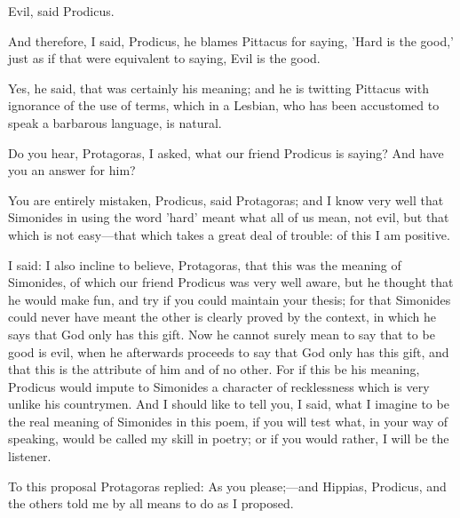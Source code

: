 \documentclass[11pt,letter]{article}
\begin{document}
\par  Evil, said Prodicus.

\par  And therefore, I said, Prodicus, he blames Pittacus for saying, 'Hard is the good,' just as if that were equivalent to saying, Evil is the good.

\par  Yes, he said, that was certainly his meaning; and he is twitting Pittacus with ignorance of the use of terms, which in a Lesbian, who has been accustomed to speak a barbarous language, is natural.

\par  Do you hear, Protagoras, I asked, what our friend Prodicus is saying? And have you an answer for him?

\par  You are entirely mistaken, Prodicus, said Protagoras; and I know very well that Simonides in using the word 'hard' meant what all of us mean, not evil, but that which is not easy—that which takes a great deal of trouble: of this I am positive.

\par  I said: I also incline to believe, Protagoras, that this was the meaning of Simonides, of which our friend Prodicus was very well aware, but he thought that he would make fun, and try if you could maintain your thesis; for that Simonides could never have meant the other is clearly proved by the context, in which he says that God only has this gift. Now he cannot surely mean to say that to be good is evil, when he afterwards proceeds to say that God only has this gift, and that this is the attribute of him and of no other. For if this be his meaning, Prodicus would impute to Simonides a character of recklessness which is very unlike his countrymen. And I should like to tell you, I said, what I imagine to be the real meaning of Simonides in this poem, if you will test what, in your way of speaking, would be called my skill in poetry; or if you would rather, I will be the listener.

\par  To this proposal Protagoras replied: As you please;—and Hippias, Prodicus, and the others told me by all means to do as I proposed.
\end{document}
